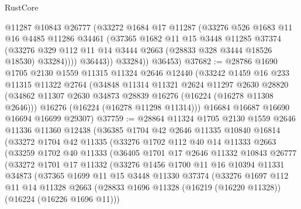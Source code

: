 \begin{lexlean}{RustCore}
\begin{coremodule}
              @11287
              @10843
              @26777
              (@33272
                @1684
                @17
                @11287
                (@33276
                  @526
                  @1683
                  @11
                  @16
                  @4485
                  @11286
                  @34461
                  (@37365
                    @1682
                    @11
                    @15
                    @3448
                    @11285
                    @37374
                    (@33276
                      @329
                      @112
                      @11
                      @14
                      @3444
                      @2663
                      (@28833 @328 @3444 @18526 @18530)
                      @33284))))
              @36443))
          @33284))
      @36453)
@37682 := @28786
    @1690
    @1705
    @2130
    @1559
    @11315
    @11324
    @2646
    @12440
    (@33242
      @1459
      @16
      @233
      @11315
      @11322
      @2764
      (@34848
        @11314
        @11321
        @2624
        @11297
        @2630
        @28820
        (@34862 @11307 @2630 @34873 @28839 @16276 (@16224 (@16278 @11308 @2646)))
        @16276
        (@16224 (@16278 @11298 @11314)))
      @16684
      @16687
      @16690
      @16694
      @16699
      @29307)
@37759 := @28864
    @11324
    @1705
    @2130
    @1559
    @2646
    @11336
    @11360
    @12438
    (@36385
      @1704
      @42
      @2646
      @11335
      @10840
      @16814
      (@33272
        @1704
        @42
        @11335
        (@33276
          @1702
          @112
          @40
          @14
          @11333
          @2663
          (@33259
            @1702
            @40
            @11333
            (@36405
              @1701
              @17
              @2646
              @11332
              @10843
              @26777
              (@33272
                @1701
                @17
                @11332
                (@33276
                  @1456
                  @1700
                  @11
                  @16
                  @10394
                  @11331
                  @34873
                  (@37365
                    @1699
                    @11
                    @15
                    @3448
                    @11330
                    @37374
                    (@33276
                      @1697
                      @112
                      @11
                      @14
                      @11328
                      @2663
                      (@28833 @1696 @11328 (@16219 (@16220 @11328)) (@16224 (@16226 @1696 @11)))

\end{coremodule}
\end{lexlean}
